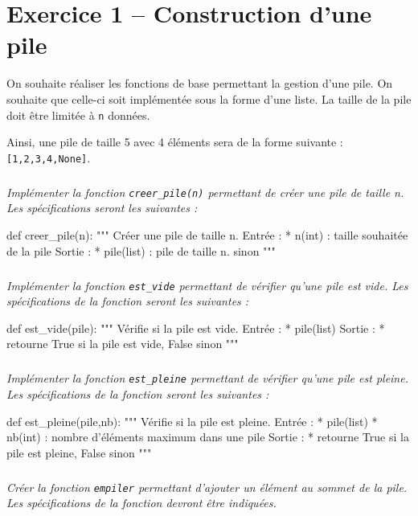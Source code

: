 
\section*{Exercice 1 -- Construction d'une pile}


\ifprof
\else
On souhaite réaliser les fonctions de base permettant la gestion d'une pile. On souhaite que celle-ci soit implémentée sous la forme d'une liste. La taille de la pile doit être limitée à \texttt{n} données.

Ainsi, une pile de taille 5 avec 4 éléments sera de la forme suivante : \texttt{[1,2,3,4,None]}.

\subparagraph{}\textit{Implémenter la fonction \texttt{creer\_pile(n)} permettant de créer une pile de taille n.  Les spécifications seront les suivantes :}
\begin{py}
\begin{python}
def creer_pile(n):
    """
    Créer une pile de taille n.
    Entrée : 
     * n(int) : taille souhaitée de la pile
    Sortie : 
     * pile(list) : pile de taille n.
     sinon
    """
\end{python}
\end{py}

\subparagraph{}\textit{Implémenter la fonction \texttt{est\_vide} permettant de vérifier qu'une pile est vide. Les spécifications de la fonction seront les suivantes : }
\begin{py}
\begin{python}
def est_vide(pile):
    """
    Vérifie si la pile est vide.
    Entrée : 
     * pile(list)
    Sortie : 
     * retourne True si la pile est vide, False 
     sinon
    """
\end{python}
\end{py}
\subparagraph{}\textit{Implémenter la fonction \texttt{est\_pleine} permettant de vérifier qu'une pile est pleine. Les spécifications de la fonction seront les suivantes :}
\begin{py}
\begin{python}
def est_pleine(pile,nb):
    """
    Vérifie si la pile est pleine.
    Entrée : 
     * pile(list)
     * nb(int) : nombre d'éléments maximum dans une pile
    Sortie : 
     * retourne True si la pile est pleine, False 
     sinon
    """
\end{python}
\end{py}
\subparagraph{}\textit{Créer la fonction \texttt{empiler} permettant d'ajouter un élément au sommet de la pile. Les spécifications de la fonction devront être indiquées.}

